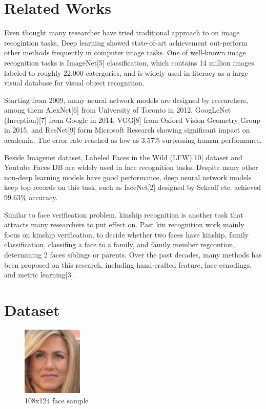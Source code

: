 \documentclass{article}
\begin{document}
\section{Related Works}

Even thought many researcher have tried traditional approach to on image
recogintion tasks, Deep learning showed state-of-art achievement out-perform
other methods frequently in computer image tasks. One of well-known image
recognition tasks is ImageNet[5] classification, which contains 14 million
images labeled to roughly 22,000 catergories, and is widely used in literacy as
a large visual database for visual object recognition.

Starting from 2009, many neural network models are designed by researchers,
among them AlexNet[6] from University of Toronto in 2012, GoogLeNet
(Inception)[7] from Google in 2014, VGG[8] from Oxford Vision Geometry Group in
2015, and ResNet[9] form Microsoft Research showing significant impact on
academia. The error rate reached as low as 3.57\% surpassing human performance.

Beside Imagenet dataset, Labeled Faces in the Wild (LFW)[10] dataset and
Youtube Faces DB are widely used in face recognition tasks. Despite many other
non-deep learning models have good performance, deep neural network models keep
top records on this task, such as faceNet[2] designed by Schroff etc. achieved
99.63\% accuracy.

Similar to face verification problem, kinship recognition is another task that
attracts many researchers to put effect on.  Past kin recognition work mainly
focus on kinship verification, to decide whether two faces have kinship, family
classification, classifing a face to a family, and family member regcontion,
determining 2 faces siblings or parents. Over the past decades, many methods
has been proposed on this research, including hand-crafted feature, face
ecnodings, and metric learning[3].

\section{Dataset}

\begin{figure}
\caption{108x124 face sample}
\includegraphics{img/P00241_face0}
\end{figure}
\end{document}
